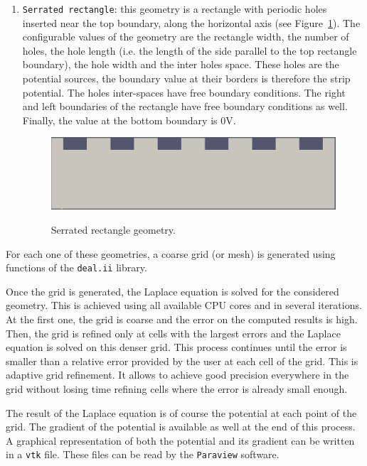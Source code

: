 \documentclass[11pt]{article}
\begin{document}
\begin{enumerate}
\item \texttt{Serrated rectangle}: this geometry is a rectangle with periodic
holes inserted near the top boundary, along the horizontal axis
(see Figure~\ref{fig:serrated_rect_geometry}).
The configurable values of the geometry are the rectangle width, the number
of holes, the hole length (i.e. the length of the side parallel to the top
rectangle boundary), the hole width and the inter holes space.
These holes are the potential sources, the boundary value at their borders is therefore
the strip potential. The holes inter-spaces have free boundary conditions.
The right and left boundaries of the rectangle have free boundary conditions as well.
Finally, the value at the bottom boundary is 0V.

\begin{figure}[H]
  \center
  \includegraphics[scale=0.2]{images/serrated_rect_geometry.png}
  \label{fig:serrated_rect_geometry}
  \caption{Serrated rectangle geometry.}
\end{figure}
\end{enumerate}


For each one of these geometries, a coarse grid (or mesh) is generated using
functions of the \texttt{deal.ii} library.

Once the grid is generated, the Laplace equation is solved for the considered
geometry. This is achieved using all available CPU cores and in several iterations.
At the first one, the
grid is coarse and the error on the computed results is high. Then, the grid is
refined only at cells with the largest errors and the Laplace equation is
solved on this denser grid. This process continues until
the error is smaller than a relative error provided by the user at each cell of
the grid. This is adaptive grid refinement. It allows to achieve good precision
everywhere in the grid without losing time refining cells where the error is already small
enough.

The result of the Laplace equation is of course the potential at each point of
the grid. The gradient of the potential is available as well at
the end of this process. A graphical representation of both the potential and
its gradient can be written in a \texttt{vtk} file.
These files can be read by the \texttt{Paraview} software.
\end{document}
